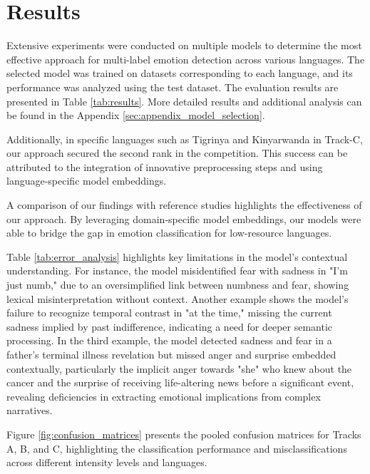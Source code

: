 \section{Results}

Extensive experiments were conducted on multiple models to determine the most effective approach for multi-label emotion detection across various languages. The selected model was trained on datasets corresponding to each language, and its performance was analyzed using the test dataset. The evaluation results are presented in Table \ref{tab:results}. More detailed results and additional analysis can be found in the Appendix \ref{sec:appendix_model_selection}.

Additionally, in specific languages such as Tigrinya and Kinyarwanda in Track-C, our approach secured the second rank in the competition. This success can be attributed to the integration of innovative preprocessing steps and using language-specific model embeddings.

A comparison of our findings with reference studies \citep{muhammad2025brighterbridginggaphumanannotated} highlights the effectiveness of our approach. By leveraging domain-specific model embeddings, our models were able to bridge the gap in emotion classification for low-resource languages.

Table \ref{tab:error_analysis} highlights key limitations in the model's contextual understanding. For instance, the model misidentified fear with sadness in "I'm just numb," due to an oversimplified link between numbness and fear, showing lexical misinterpretation without context. Another example shows the model's failure to recognize temporal contrast in "at the time," missing the current sadness implied by past indifference, indicating a need for deeper semantic processing. In the third example, the model detected sadness and fear in a father's terminal illness revelation but missed anger and surprise embedded contextually, particularly the implicit anger towards "she" who knew about the cancer and the surprise of receiving life-altering news before a significant event, revealing deficiencies in extracting emotional implications from complex narratives.

Figure \ref{fig:confusion_matrices} presents the pooled confusion matrices for Tracks A, B, and C, highlighting the classification performance and misclassifications across different intensity levels and languages.


